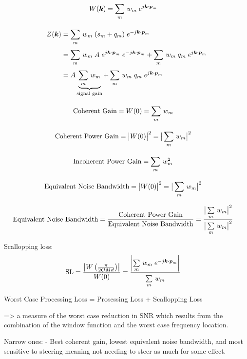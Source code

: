 \begin{align}
W(\boldsymbol{k}) &= \sum\limits_{m}^{}\, w_m\;e^{j\boldsymbol{k}\cdot\boldsymbol{p}_m}
\end{align}

\begin{align}
Z(\boldsymbol{k}) &= \sum\limits_{m}^{}\, w_m\;(s_m+q_m)\;e^{-j\boldsymbol{k}\cdot\boldsymbol{p}_m} \nonumber\\
&= \sum\limits_{m}^{}\, w_m\;A\;e^{j\boldsymbol{k}\cdot\boldsymbol{p}_m}\;e^{-j\boldsymbol{k}\cdot\boldsymbol{p}_m} + \sum\limits_{m}^{}\, w_m\;q_m\;e^{j\boldsymbol{k}\cdot\boldsymbol{p}_m} \nonumber\\
&= A \underbrace{\sum\limits_{m}^{}\, w_m}_\text{signal gain} + \sum\limits_{m}^{}\, w_m\;q_m\;e^{j\boldsymbol{k}\cdot\boldsymbol{p}_m}
\end{align}


\begin{align}
\text{Coherent Gain} &= W(0) = \sum\limits_{m}^{}\,w_m
\end{align}

\begin{align}
\text{Coherent Power Gain} &= \big|W(0)\big|^2 = \big|\sum\limits_{m}^{}\,w_m \big|^2
\end{align}

\begin{align}
\text{Incoherent Power Gain} &= \sum\limits_{m}^{}\,w_m^2
\end{align}

\begin{align}
\text{Equivalent Noise Bandwidth} &= \big|W(0)\big|^2 = \big|\sum\limits_{m}^{}\,w_m \big|^2
\end{align}

\begin{align}
\text{Equivalent Noise Bandwidth} &= \frac{\text{Coherent Power Gain}}{\text{Equivalent Noise Bandwidth}} = \frac{\big|\sum\limits_{m}^{}\,w_m \big|^2}{\big|\sum\limits_{m}^{}\,w_m \big|^2}
\end{align}

Scallopping loss:
\begin{align}
\text{SL} &= \frac{\left|W\left(\frac{\pi}{2OMd}\right)\right|}{W(0)} = \frac{\left|\sum\limits_{m}^{}\,w_m\;e^{-j\boldsymbol{k}\cdot\boldsymbol{p}_m}\right|}{\sum\limits_{m}^{}\,w_m}
\end{align}

Worst Case Processing Loss = Prosessing Loss + Scallopping Loss

=> a measure of the worst case reduction in SNR which results from the combination of the window function and the worst case frequency location.


Narrow ones:
- Best coherent gain, lowest equivalent noise bandwidth, and most sensitive to steering meaning not needing to steer as much for some effect.

